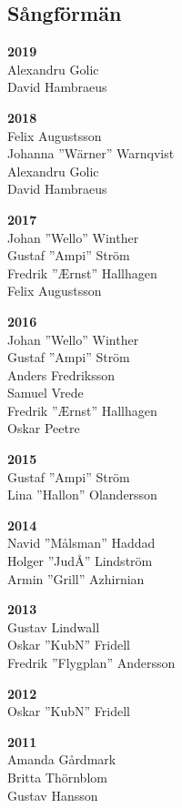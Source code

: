 \begin{flushleft}
\section{Sångförmän}
\vspace{-1em}
\end{flushleft}

{\large
\setlength{\parskip}{0.5em}
\setlength\columnsep{3em}

\begin{multicols}{2}
\textbf{2019}\\
Alexandru Golic\\
David Hambraeus

\textbf{2018}\\
Felix Augustsson\\
Johanna ''Wärner'' Warnqvist\\
Alexandru Golic\\
David Hambraeus

\textbf{2017}\\
Johan ''Wello'' Winther\\
Gustaf ''Ampi'' Ström\\
Fredrik ''Ærnst'' Hallhagen\\
Felix Augustsson

\textbf{2016}\\
Johan ''Wello'' Winther\\
Gustaf ''Ampi'' Ström\\
Anders Fredriksson\\
Samuel Vrede\\
Fredrik ''Ærnst'' Hallhagen\\
Oskar Peetre

\textbf{2015}\\
Gustaf ''Ampi'' Ström\\
Lina ''Hallon'' Olandersson

\textbf{2014}\\
Navid ''Målsman'' Haddad\\
Holger ''JudÅ'' Lindström\\
Armin ''Grill'' Azhirnian

\textbf{2013}\\
Gustav Lindwall\\
Oskar ''KubN'' Fridell\\
Fredrik ''Flygplan'' Andersson

\textbf{2012}\\
Oskar ''KubN'' Fridell

\textbf{2011}\\
Amanda Gårdmark\\
Britta Thörnblom\\
Gustav Hansson


\end{multicols}}
